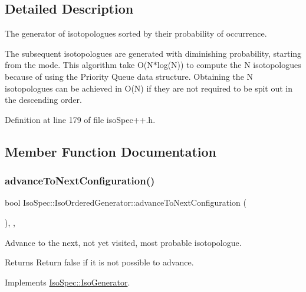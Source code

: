 \subsection{Detailed Description}
The generator of isotopologues sorted by their probability of occurrence. 

The subsequent isotopologues are generated with diminishing probability, starting from the mode. This algorithm take O(\+N$\ast$log(\+N)) to compute the N isotopologues because of using the Priority Queue data structure. Obtaining the N isotopologues can be achieved in O(\+N) if they are not required to be spit out in the descending order. 

Definition at line 179 of file iso\+Spec++.\+h.



\subsection{Member Function Documentation}
\mbox{\label{class_iso_spec_1_1_iso_ordered_generator_aa2438bb81fb1d68eda1637d67e9cb36d}} 
\subsubsection{\texorpdfstring{advance\+To\+Next\+Configuration()}{advanceToNextConfiguration()}}
{\footnotesize\ttfamily bool Iso\+Spec\+::\+Iso\+Ordered\+Generator\+::advance\+To\+Next\+Configuration (\begin{DoxyParamCaption}{ }\end{DoxyParamCaption})\hspace{0.3cm}{\ttfamily [final]}, {\ttfamily [override]}, {\ttfamily [virtual]}}



Advance to the next, not yet visited, most probable isotopologue. 

\begin{DoxyReturn}{Returns}
Return false if it is not possible to advance. 
\end{DoxyReturn}


Implements \mbox{\hyperlink{class_iso_spec_1_1_iso_generator_a20f48ba18c6aecc57d73b2c3ec3a11dd}{Iso\+Spec\+::\+Iso\+Generator}}.



